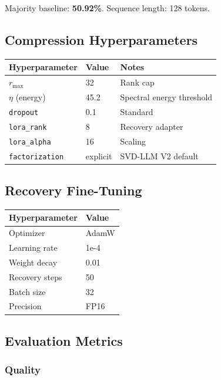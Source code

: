Majority baseline: \textbf{50.92\%}. Sequence length: 128 tokens.

\subsection{Compression Hyperparameters}

\begin{table}[H]
\centering
\small
\begin{tabular}{lll}
\toprule
\textbf{Hyperparameter} & \textbf{Value} & \textbf{Notes} \\
\midrule
$r_\text{max}$ & 32 & Rank cap \\
$\eta$ (energy) & 45.2 & Spectral energy threshold \\
\texttt{dropout} & 0.1 & Standard \\
\texttt{lora\_rank} & 8 & Recovery adapter \\
\texttt{lora\_alpha} & 16 & Scaling \\
\texttt{factorization} & explicit & SVD-LLM V2 default \\
\bottomrule
\end{tabular}
\end{table}

\subsection{Recovery Fine-Tuning}

\begin{table}[H]
\centering
\small
\begin{tabular}{ll}
\toprule
\textbf{Hyperparameter} & \textbf{Value} \\
\midrule
Optimizer & AdamW \\
Learning rate & 1e-4 \\
Weight decay & 0.01 \\
Recovery steps & 50 \\
Batch size & 32 \\
Precision & FP16 \\
\bottomrule
\end{tabular}
\end{table}

\subsection{Evaluation Metrics}

\subsubsection{Quality}

